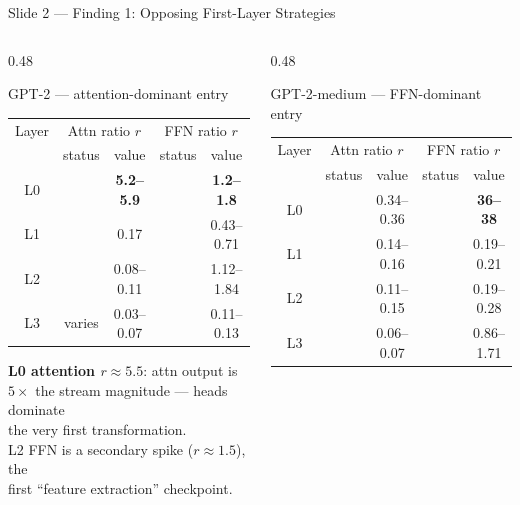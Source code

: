 \documentclass[aspectratio=169,10pt]{beamer}
\newcommand{\cmark}{\ding{51}}
\newcommand{\yes}[1]{\textcolor{teal}{\textbf{#1}}}
\newcommand{\hi}[1] {\textcolor{attnred}{\textbf{#1}}}
\begin{document}
\begin{frame}{Slide 2 — Finding 1: Opposing First-Layer Strategies}

\begin{columns}[T]

\begin{column}{0.48\textwidth}
\begin{block}{\textcolor{attnred}{GPT-2} — attention-dominant entry}
\footnotesize
\begin{tabular}{ccccc}
\toprule
Layer & \multicolumn{2}{c}{Attn ratio $r$} & \multicolumn{2}{c}{FFN ratio $r$} \\
      & status & value & status & value \\
\midrule
L0 & \yes{\cmark{}} & \hi{5.2–5.9} & \yes{\cmark{}} & \hi{1.2–1.8} \\
L1 & \yes{\cmark{}} & 0.17         & \yes{\cmark{}} & 0.43–0.71 \\
L2 & \yes{\cmark{}} & 0.08–0.11    & \yes{\cmark{}} & 1.12–1.84 \\
L3 & varies  & 0.03–0.07    & \yes{\cmark{}} & 0.11–0.13 \\
\bottomrule
\end{tabular}

\medskip
\textbf{L0 attention $r \approx 5.5$}: attn output is\\
$5\times$ the stream magnitude — heads dominate\\
the very first transformation.\\[4pt]
L2 FFN is a secondary spike ($r \approx 1.5$), the\\
first ``feature extraction'' checkpoint.
\end{block}
\end{column}

\begin{column}{0.48\textwidth}
\begin{block}{\textcolor{mlpblue}{GPT-2-medium} — FFN-dominant entry}
\footnotesize
\begin{tabular}{ccccc}
\toprule
Layer & \multicolumn{2}{c}{Attn ratio $r$} & \multicolumn{2}{c}{FFN ratio $r$} \\
      & status & value & status & value \\
\midrule
L0 & \yes{\cmark{}} & 0.34–0.36    & \yes{\cmark{}} & \hi{36–38} \\
L1 & \yes{\cmark{}} & 0.14–0.16    & \yes{\cmark{}} & 0.19–0.21 \\
L2 & \yes{\cmark{}} & 0.11–0.15    & \yes{\cmark{}} & 0.19–0.28 \\
L3 & \yes{\cmark{}} & 0.06–0.07    & \yes{\cmark{}} & 0.86–1.71 \\
\bottomrule
\end{tabular}


\end{block}
\end{column}
\end{columns}
\end{frame}
\end{document}
